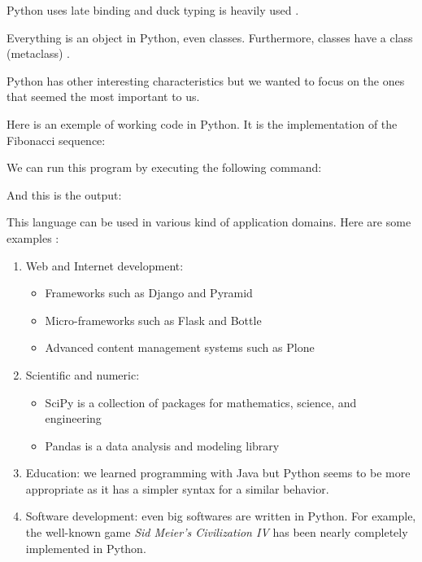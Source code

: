 Python uses late binding \cite{python_pep0289} and duck typing is heavily used \cite{wikipediaEN_duck_typing_python}.

Everything is an object in Python, even classes. Furthermore, classes have a class (metaclass) \cite{python_datamodel}.

Python has other interesting characteristics but we wanted to focus on the ones that seemed the most important to us.
\newline

Here is an exemple of working code in Python. It is the implementation of the Fibonacci sequence:


We can run this program by executing the following command:


And this is the output:


This language can be used in various kind of application domains. Here are some examples \cite{python_applications}:
\begin{enumerate}
    \item {Web and Internet development:
        \begin{itemize}
            \item Frameworks such as Django and Pyramid
            \item Micro-frameworks such as Flask and Bottle
            \item Advanced content management systems such as Plone
        \end{itemize}
    }
    \item {Scientific and numeric:
        \begin{itemize}
            \item SciPy is a collection of packages for mathematics, science, and engineering
            \item Pandas is a data analysis and modeling library
        \end{itemize}
    
    }
    \item Education: we learned programming with Java but Python seems to be more appropriate as it has a simpler syntax for a similar behavior.
    \item Software development: even big softwares are written in Python. For example, the well-known game \emph{Sid Meier's Civilization IV} has been nearly completely implemented in Python.
\end{enumerate}
